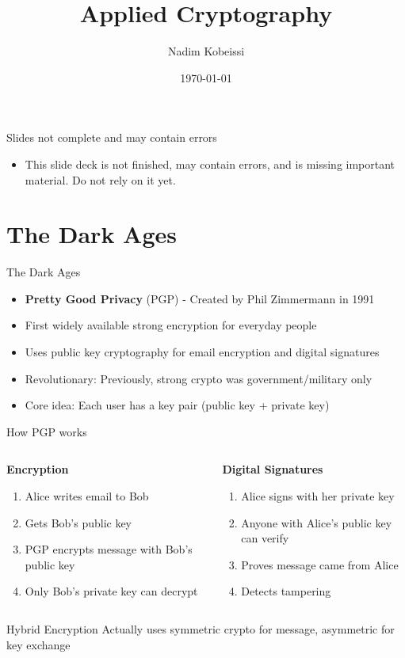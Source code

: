 \documentclass[aspectratio=169, lualatex, handout]{beamer}
\title{Applied Cryptography}
\author{Nadim Kobeissi}
\institute{American University of Beirut}
\date{\today}
\begin{document}
\begin{frame}[plain]
	\titlepage
\end{frame}

\begin{frame}{Slides not complete and may contain errors}
	\begin{itemize}
		\item This slide deck is not finished, may contain errors, and is missing important material. Do not rely on it yet.
	\end{itemize}
\end{frame}

\section{The Dark Ages}

\begin{frame}{The Dark Ages}
	\begin{itemize}
		\item \textbf{Pretty Good Privacy} (PGP) - Created by Phil Zimmermann in 1991
		\item First widely available strong encryption for everyday people
		\item Uses public key cryptography for email encryption and digital signatures
		\item Revolutionary: Previously, strong crypto was government/military only
		\item Core idea: Each user has a key pair (public key + private key)
	\end{itemize}
\end{frame}

\begin{frame}{How PGP works}
	\begin{columns}
		\begin{column}{0.5\textwidth}
			\textbf{Encryption}
			\begin{enumerate}
				\item Alice writes email to Bob
				\item Gets Bob's public key
				\item PGP encrypts message with Bob's public key
				\item Only Bob's private key can decrypt
			\end{enumerate}
		\end{column}
		\begin{column}{0.5\textwidth}
			\textbf{Digital Signatures}
			\begin{enumerate}
				\item Alice signs with her private key
				\item Anyone with Alice's public key can verify
				\item Proves message came from Alice
				\item Detects tampering
			\end{enumerate}
		\end{column}
	\end{columns}
	\begin{alertblock}{Hybrid Encryption}
		Actually uses symmetric crypto for message, asymmetric for key exchange
	\end{alertblock}
\end{frame}
\end{document}
